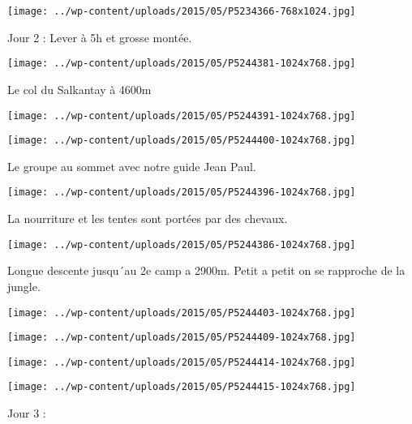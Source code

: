  \newline
\centerline{\texttt{[image: ../wp-content/uploads/2015/05/P5234366-768x1024.jpg]} } 
 \newline
 Jour 2 : \newline
 Lever à 5h et grosse montée. \newline
 \newline
\centerline{\texttt{[image: ../wp-content/uploads/2015/05/P5244381-1024x768.jpg]} } 
 \newline
 Le col du Salkantay à 4600m \newline
 \newline
\centerline{\texttt{[image: ../wp-content/uploads/2015/05/P5244391-1024x768.jpg]} } 
 \newline
 \newline
\centerline{\texttt{[image: ../wp-content/uploads/2015/05/P5244400-1024x768.jpg]} } 
 \newline
 Le groupe au sommet avec notre guide Jean Paul. \newline
 \newline
\centerline{\texttt{[image: ../wp-content/uploads/2015/05/P5244396-1024x768.jpg]} } 
 \newline
 La nourriture et les tentes sont portées par des chevaux. \newline
 \newline
\centerline{\texttt{[image: ../wp-content/uploads/2015/05/P5244386-1024x768.jpg]} } 
 \newline
 Longue descente jusqu´au 2e camp a 2900m. Petit a petit on se rapproche de la jungle. \newline
 \newline
\centerline{\texttt{[image: ../wp-content/uploads/2015/05/P5244403-1024x768.jpg]} } 
 \newline
 \newline
\centerline{\texttt{[image: ../wp-content/uploads/2015/05/P5244409-1024x768.jpg]} } 
 \newline
 \newline
\centerline{\texttt{[image: ../wp-content/uploads/2015/05/P5244414-1024x768.jpg]} } 
 \newline
 \newline
\centerline{\texttt{[image: ../wp-content/uploads/2015/05/P5244415-1024x768.jpg]} } 
 \newline
 Jour 3 : \newline
